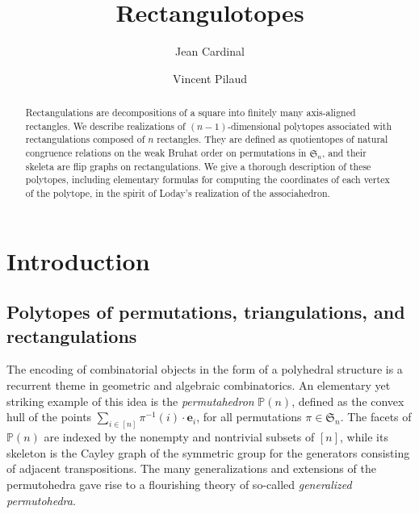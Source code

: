 \documentclass{amsart}
\title{Rectangulotopes}
\author{Jean Cardinal}
\author{Vincent Pilaud}
\theoremstyle{definition}
\newcommand{\f}[1]{\mathfrak{#1}} %
\newcommand{\darkblue}{\color{darkblue}} %
\newcommand{\defn}[1]{\textsl{\darkblue #1}} %
\newcommand{\polytope}[1]{\mathds{#1}} %
\begin{document}
\begin{abstract}
  Rectangulations are decompositions of a square into finitely many axis-aligned rectangles.
  We describe realizations of $(n-1)$-dimensional polytopes associated with rectangulations composed of $n$ rectangles. They are defined as quotientopes of natural congruence relations on the weak Bruhat order on permutations in $\f{S}_n$, and their skeleta are flip graphs on rectangulations. We give a thorough description of these polytopes, including elementary formulas for computing the coordinates of each vertex of the polytope, in the spirit of Loday's realization of the associahedron.
\end{abstract}

\maketitle

\tableofcontents

\section{Introduction}

\subsection{Polytopes of permutations, triangulations, and rectangulations}

The encoding of combinatorial objects in the form of a polyhedral structure is a recurrent theme in geometric and algebraic combinatorics. An elementary yet striking example of this idea is the \defn{permutahedron} $\polytope{P} (n)$, defined as the convex hull of the points $\sum_{i\in [n]} \pi^{-1}(i)\cdot \mathbf{e}_i$, for all permutations $\pi\in\f{S}_n$. The facets of $\polytope{P} (n)$ are indexed by the nonempty and nontrivial subsets of $[n]$, while its skeleton is the Cayley graph of the symmetric group for the generators consisting of adjacent transpositions. The many generalizations and extensions of the permutohedra gave rise to a flourishing theory of so-called \defn{generalized permutohedra}.
\end{document}
